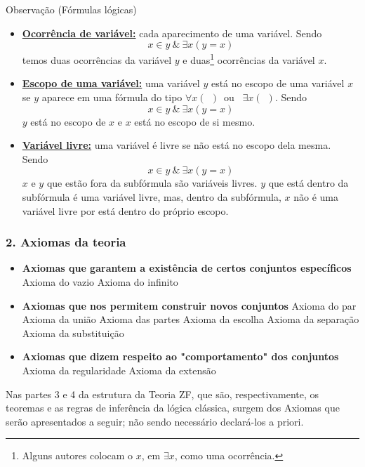          \begin{mymdframed}{Observação (Fórmulas lógicas)}
            \begin{itemize}
               \item\textbf{\underline{Ocorrência de variável:}} cada aparecimento de uma variável.
                  Sendo $$x \in y\ \&\ \exists x (y = x)$$
                  temos duas ocorrências da variável $y$ e duas\footnote[1]{Alguns autores colocam o $x$, em $\exists x$, como uma ocorrência.} ocorrências da variável $x$.
               \item \textbf{\underline{Escopo de uma variável:}} uma variável $y$ está no escopo de uma variável $x$ se $y$ aparece em uma fórmula do tipo $\forall x (\ \ )$\ ou \ $\exists x (\ \ )$.
                  Sendo $$x \in y\ \& \ \exists x (y = x)$$
                  $y$ está no escopo de $x$ e $x$ está no escopo de si mesmo.
               \item \textbf{\underline{Variável livre:}} uma variável é livre se não está no escopo dela mesma.
                  Sendo $$x \in y\ \& \ \exists x (y = x)$$
                  $x$ e $y$ que estão fora da subfórmula são variáveis livres. $y$ que está dentro da subfórmula é uma variável livre, mas, dentro da subfórmula, $x$ não é uma variável livre por está dentro do próprio escopo.
            \end{itemize}
         \end{mymdframed}

      \subsubsection*{2. Axiomas da teoria}  
         \begin{itemize}
            \item \textbf{Axiomas que garantem a existência de certos conjuntos específicos}
               \subitem Axioma do vazio
               \subitem Axioma do infinito    
            \item \textbf{Axiomas que nos permitem construir novos conjuntos}
               \subitem Axioma do par
               \subitem Axioma da união
               \subitem Axioma das partes
               \subitem Axioma da escolha
               \subitem Axioma da separação
               \subitem Axioma da substituição
            \item \textbf{Axiomas que dizem respeito ao "comportamento" dos conjuntos}
               \subitem Axioma da regularidade 
               \subitem Axioma da extensão
         \end{itemize}
         Nas partes 3 e 4 da estrutura da Teoria ZF, que são, respectivamente, os teoremas e as regras de inferência da lógica clássica, surgem dos Axiomas que serão apresentados a seguir; não sendo necessário declará-los a priori.


